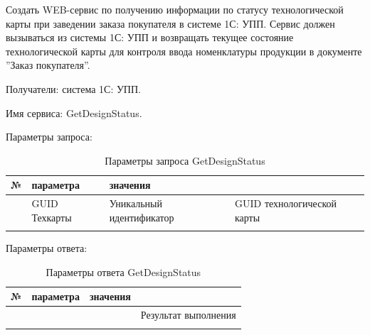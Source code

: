 
\label{exchange:GetDesignStatus}

 Создать WEB-сервис по получению информации по статусу технологической карты при заведении заказа покупателя в системе 1С: УПП.
 Сервис должен вызываться из системы 1С: УПП и возвращать текущее состояние технологической карты для контроля ввода номенклатуры продукции в документе ''Заказ покупателя''.

 Получатели: система 1С: УПП.

 Имя сервиса: GetDesignStatus.

 




Параметры запроса:
\pc
\scriptsize
\begin{longtable}{|p{10mm}|p{35mm}|p{40mm}|p{60mm}|}
\hline
\parbox[c][5mm]{10mm}{\centering№} & \parbox[c]{35mm}{ параметра} & \parbox[c]{40mm}{ значения} & \parbox[c]{60mm}{} \\
\hline
\parbox[c][5mm]{15mm}{\p} & GUID Техкарты & Уникальный идентификатор & GUID технологической карты \\
\hline
\caption{Параметры запроса GetDesignStatus}\label{ex:GetDesignStatus}
\end{longtable}  
\normalsize



 
Параметры ответа:
\pc
\scriptsize
\begin{longtable}{|p{10mm}|p{40mm}|p{20mm}|p{75mm}|}
\hline
\parbox[c][5mm]{10mm}{\centering№} & \parbox[c]{40mm}{ параметра} & \parbox[c]{20mm}{ значения} & \parbox[c]{75mm}{} \\
\hline
\parbox[c][5mm]{15mm}{\p} & \parbox[c]{30mm}{} & \parbox[c]{50mm}{} & \parbox[c]{75mm}{Результат выполнения} \\
\hline
\caption{Параметры ответа GetDesignStatus}\label{ex:out_GetDesignStatus}
\end{longtable}  
\normalsize






